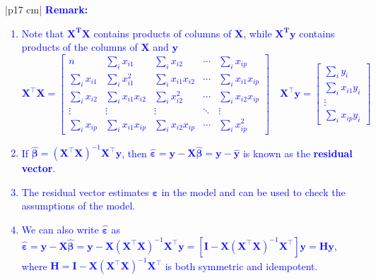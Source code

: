 \documentclass[a4paper,11pt]{article}
\begin{document}
\begin{longtable}{|p{17 cm}|}
\hline
\textcolor{blue}{\textbf{Remark:}} \\
\begin{minipage}{\linewidth} 
\vspace{-0.15cm}
\textcolor{blue}{\begin{enumerate}[noitemsep, topsep=0pt, partopsep=0pt, parsep=0pt]
    \item Note that $\mathbf{X^T X}$ contains products of columns of $\mathbf{X}$, while $\mathbf{X^T y}$ contains products of the columns of $\mathbf{X}$ and $\mathbf{y}$
    $$
    \mathbf{X}^\top \mathbf{X} =
    \begin{bmatrix}
        n & \sum\limits_{i} x_{i1} & \sum\limits_{i} x_{i2} & \cdots & \sum\limits_{i} x_{ip} \\
        \sum\limits_{i} x_{i1} & \sum\limits_{i} x_{i1}^2 & \sum\limits_{i} x_{i1} x_{i2} & \cdots & \sum\limits_{i} x_{i1} x_{ip} \\
        \sum\limits_{i} x_{i2} & \sum\limits_{i} x_{i1} x_{i2} & \sum\limits_{i} x_{i2}^2 & \cdots & \sum\limits_{i} x_{i2} x_{ip} \\
        \vdots & \vdots & \vdots & \ddots & \vdots \\
        \sum\limits_{i} x_{ip} & \sum\limits_{i} x_{i1} x_{ip} & \sum\limits_{i} x_{i2} x_{ip} & \cdots & \sum\limits_{i} x_{ip}^2
    \end{bmatrix}
    \quad
    \mathbf{X}^\top \mathbf{y} =
    \begin{bmatrix}
        \sum\limits_{i} y_{i} \\
        \sum\limits_{i} x_{i1} y_{i} \\
        \vdots \\
        \sum\limits_{i} x_{ip} y_{i}
    \end{bmatrix}
    $$
    \item If $\hat{\boldsymbol{\beta}} = \left( \mathbf{X}^\top \mathbf{X} \right)^{-1} \mathbf{X}^\top \mathbf{y}$, then $\hat{\boldsymbol{\varepsilon}} = \mathbf{y} - \mathbf{X} \hat{\boldsymbol{\beta}} = \mathbf{y} - \hat{\mathbf{y}}$ is known as the \textbf{residual vector}.
    \item The residual vector estimates $\bm{\varepsilon}$ in the model and can be used to check the assumptions of the model.
    \item We can also write $\hat{\boldsymbol{\varepsilon}}$ as $\hat{\bm{\varepsilon}} = \mathbf{y} - \mathbf{X} \hat{\boldsymbol{\beta}} = \mathbf{y} - \mathbf{X} \left( \mathbf{X}^\top \mathbf{X} \right)^{-1} \mathbf{X}^\top \mathbf{y} = \left[ \mathbf{I} - \mathbf{X} \left( \mathbf{X}^\top \mathbf{X} \right)^{-1} \mathbf{X}^\top \right] \mathbf{y} = \mathbf{H} \mathbf{y}$, where $\mathbf{H} = \mathbf{I} - \mathbf{X} \left( \mathbf{X}^\top \mathbf{X} \right)^{-1} \mathbf{X}^\top$ is both symmetric and idempotent.        

\end{enumerate}}
\end{minipage}
\end{longtable}
\end{document}
